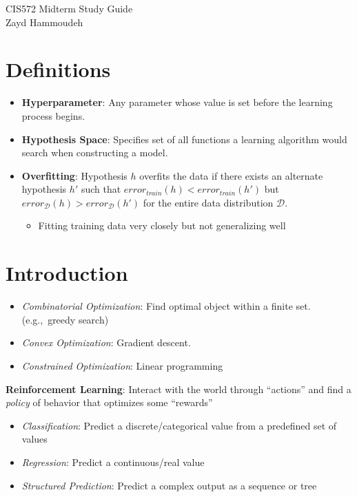 \documentclass[10pt]{article}
\begin{document}
\begin{center}
  {\Large CIS572 Midterm Study Guide} \\\vspace{6pt}
  Zayd Hammoudeh
\end{center}

\begin{multicols}{3}
  \section*{Definitions}

  \begin{itemize}
    \item \textbf{Hyperparameter}: Any parameter whose value is set before the learning process begins.
    \item \textbf{Hypothesis Space}: Specifies set of all functions a learning algorithm would search when constructing a model.
    \item \textbf{Overfitting}: Hypothesis $h$ overfits the data if there exists an alternate hypothesis $h'$ such that $error_{train}(h) < error_{train}(h')$ but $error_{\mathcal{D}}(h) > error_{\mathcal{D}}(h')$ for the entire data distribution $\mathcal{D}$.
     \begin{itemize}
       \item Fitting training data very closely but not generalizing well
     \end{itemize}
  \end{itemize}

  \section{Introduction}

  \begin{itemize}
    \item \textit{Combinatorial Optimization}: Find optimal object within a finite set. (e.g.,~greedy search)
    \item \textit{Convex Optimization}: Gradient descent.
    \item \textit{Constrained Optimization}: Linear programming
  \end{itemize}

  \textbf{Reinforcement Learning}: Interact with the world through ``actions'' and find a \textit{policy} of behavior that optimizes some ``rewards''

  \begin{itemize}
    \item \textit{Classification}: Predict a discrete/categorical value from a predefined set of values
    \item \textit{Regression}: Predict a continuous/real value
    \item \textit{Structured Prediction}: Predict a complex output as a sequence or tree
  \end{itemize}


\end{multicols}
\end{document}
